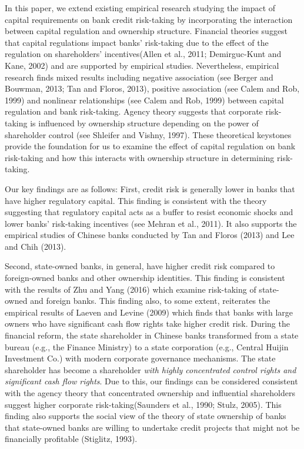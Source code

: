 \documentclass[
  12pt,
  a4paper,
]{scrreprt}
\begin{document}
In this paper, we extend existing empirical research studying the impact
of capital requirements on bank credit risk-taking by incorporating the
interaction between capital regulation and ownership structure.
Financial theories suggest that capital regulations impact banks'
risk-taking due to the effect of the regulation on shareholders'
incentives(Allen et al., 2011; Demirguc-Kunt and Kane, 2002) and are
supported by empirical studies. Nevertheless, empirical research finds
mixed results including negative association (see Berger and Bouwman,
2013; Tan and Floros, 2013), positive association (see Calem and Rob,
1999) and nonlinear relationships (see Calem and Rob, 1999) between
capital regulation and bank risk-taking. Agency theory suggests that
corporate risk-taking is influenced by ownership structure depending on
the power of shareholder control (see Shleifer and Vishny, 1997). These
theoretical keystones provide the foundation for us to examine the
effect of capital regulation on bank risk-taking and how this interacts
with ownership structure in determining risk-taking.

Our key findings are as follows: First, credit risk is generally lower
in banks that have higher regulatory capital. This finding is consistent
with the theory suggesting that regulatory capital acts as a buffer to
resist economic shocks and lower banks' risk-taking incentives (see
Mehran et al., 2011). It also supports the empirical studies of Chinese
banks conducted by Tan and Floros (2013) and Lee and Chih (2013).

Second, state-owned banks, in general, have higher credit risk compared
to foreign-owned banks and other ownership identities. This finding is
consistent with the results of Zhu and Yang (2016) which examine
risk-taking of state-owned and foreign banks. This finding also, to some
extent, reiterates the empirical results of Laeven and Levine (2009)
which finds that banks with large owners who have significant cash flow
rights take higher credit risk. During the financial reform, the state
shareholder in Chinese banks transformed from a state bureau (e.g., the
Finance Ministry) to a state corporation (e.g., Central Huijin
Investment Co.) with modern corporate governance mechanisms. The state
shareholder has become a shareholder \emph{with highly concentrated
control rights and significant cash flow rights}. Due to this, our
findings can be considered consistent with the agency theory that
concentrated ownership and influential shareholders suggest higher
corporate risk-taking(Saunders et al., 1990; Stulz, 2005). This finding
also supports the social view of the theory of state ownership of banks
that state-owned banks are willing to undertake credit projects that
might not be financially profitable (Stiglitz, 1993).
\end{document}
